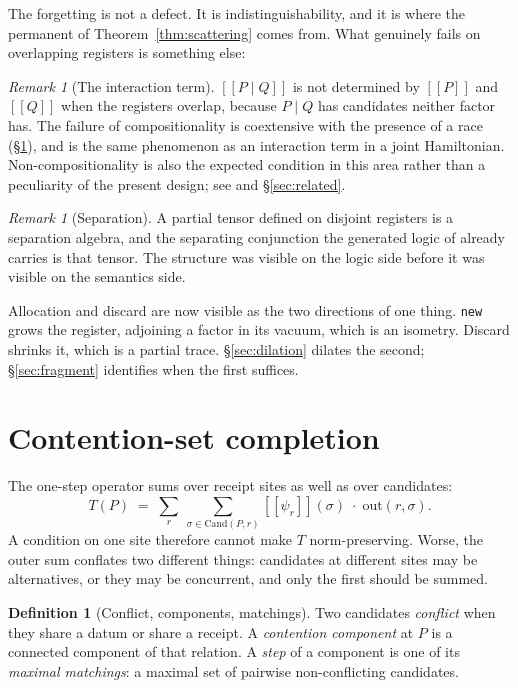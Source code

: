 \documentclass[11pt,a4paper]{article}
\theoremstyle{plain}
\theoremstyle{definition}
\newtheorem{definition}[theorem]{Definition}
\theoremstyle{remark}
\newtheorem{remark}[theorem]{Remark}
\newcommand{\sem}[1]{[\![#1]\!]}
\newcommand{\Cand}{\mathrm{Cand}}
\newcommand{\Out}{\mathrm{out}}
\begin{document}
The forgetting is not a defect. It is indistinguishability, and it is where the
permanent of Theorem~\ref{thm:scattering} comes from. What genuinely fails on
overlapping registers is something else:

\begin{remark}[The interaction term]\label{rem:interaction}
$\sem{P \mid Q}$ is not determined by $\sem{P}$ and $\sem{Q}$ when the registers
overlap, because $P \mid Q$ has candidates neither factor has. The failure of
compositionality is coextensive with the presence of a race
(\S\ref{sec:completion}), and is the same phenomenon as an interaction term in a
joint Hamiltonian. Non-compositionality is also the expected condition in this
area rather than a peculiarity of the present design; see \cite{YingYuFeng} and
\S\ref{sec:related}.
\end{remark}

\begin{remark}[Separation]\label{rem:separation}
A partial tensor defined on disjoint registers is a separation algebra, and the
separating conjunction the generated logic of \cite{ResAlg} already carries is
that tensor. The structure was visible on the logic side before it was visible
on the semantics side.
\end{remark}

Allocation and discard are now visible as the two directions of one thing.
\texttt{new} grows the register, adjoining a factor in its vacuum, which is an
isometry. Discard shrinks it, which is a partial trace. \S\ref{sec:dilation}
dilates the second; \S\ref{sec:fragment} identifies when the first suffices.
\section{Contention-set completion}\label{sec:completion}

The one-step operator sums over receipt sites as well as over candidates:
\begin{equation}\label{eq:onestep}
  T(P) \;=\; \sum_{r}\ \sum_{\sigma \in \Cand(P,r)}
    \sem{\psi_r}(\sigma)\;\cdot\;\Out(r,\sigma).
\end{equation}
A condition on one site therefore cannot make $T$ norm-preserving. Worse, the
outer sum conflates two different things: candidates at different sites may be
alternatives, or they may be concurrent, and only the first should be summed.

\begin{definition}[Conflict, components, matchings]\label{def:conflict}
Two candidates \emph{conflict} when they share a datum or share a receipt.
A \emph{contention component} at $P$ is a connected component of that relation.
A \emph{step} of a component is one of its \emph{maximal matchings}: a maximal
set of pairwise non-conflicting candidates.
\end{definition}
\end{document}
